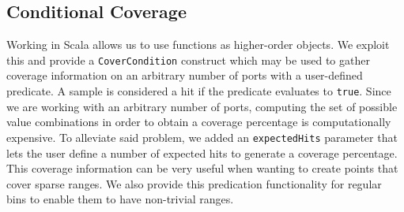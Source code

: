\documentclass[conference]{IEEEtran}
\begin{document}
\subsection{Conditional Coverage}
Working in Scala allows us to use functions as higher-order objects. 
We exploit this and provide a \texttt{CoverCondition} construct which may be used to gather coverage information on an arbitrary number of ports with a user-defined predicate.%
A sample is considered a hit if the predicate evaluates to \texttt{true}.%
Since we are working with an arbitrary number of ports, computing the set of possible value combinations in order to obtain a coverage percentage is computationally expensive.
To alleviate said problem, we added an \texttt{expectedHits} parameter that lets the user define a number of expected hits to generate a coverage percentage.
This coverage information can be very useful when wanting to create points that cover sparse ranges.   
We also provide this predication functionality for regular bins to enable them to have non-trivial ranges.%
\end{document}
